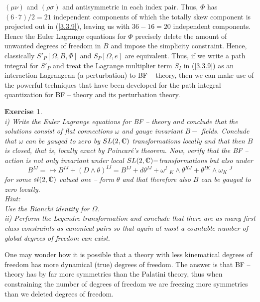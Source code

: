 \documentclass[12pt]{report}
\newtheorem{Exercise}{Exercise}[section]
\def\be{\begin{equation}}
\def\ee{\end{equation}}
\def\Cl{{\mathchoice
{\setbox0=\hbox{$\displaystyle\rm C$}\hbox{\hbox to0pt
{\kern0.4\wd0\vrule height0.9\ht0\hss}\box0}}
{\setbox0=\hbox{$\textstyle\rm C$}\hbox{\hbox to0pt
{\kern0.4\wd0\vrule height0.9\ht0\hss}\box0}}
{\setbox0=\hbox{$\scriptstyle\rm C$}\hbox{\hbox to0pt
{\kern0.4\wd0\vrule height0.9\ht0\hss}\box0}}
{\setbox0=\hbox{$\scriptscriptstyle\rm C$}\hbox{\hbox to0pt
{\kern0.4\wd0\vrule height0.9\ht0\hss}\box0}}}}
\begin{document}
$(\mu\nu)$ and $(\rho\sigma)$ and antisymmetric in each index pair.
Thus, $\Phi$ has $(6\cdot 7)/2=21$ independent components of which 
the totally skew component is projected out in (\ref{3.3.9}), leaving
us with $36-16=20$ independent components. Hence the Euler Lagrange
equations for $\Phi$ precisely delete the amount of unwanted degrees of 
freedom in $B$ and impose the simplicity constraint. Hence, 
classically $S'_P[\Omega,B,\Phi]$ and $S_P[\Omega,e]$ are equivalent. 
Thus, if we write a path integral for $S'_P$ and treat the Lagrange 
multiplier term $S_I$ in (\ref{3.3.9}) as an interaction Lagrangean  
(a perturbation) to BF -- theory, then
we can make use of the powerful techniques that have been developed for 
the path integral quantization for BF -- theory and its perturbation 
theory. 
%
\begin{Exercise} \label{ex3.3.2}  ~~~\\    
i) Write the Euler Lagrange equations for BF -- theory and conclude that
the solutions consist of flat connections $\omega$ and gauge invariant
$B-$ fields. Conclude that $\omega$ can be gauged to $zero$ by $SL(2,\Cl)$ 
transformations locally and that then $B$ is closed, that is, locally 
exact by Poincar\'e's theorem. Now, verify that the BF -- action is not 
only invariant under local $SL(2,\Cl)-$transformations but also under
\be \label{ex3.3.2a} 
B^{IJ}=\mapsto B^{IJ}+(D\wedge \theta)^{IJ}=
B^{IJ}+d\theta^{IJ}+\omega^I\;_K\wedge 
\theta^{KJ}+\theta^{IK}\wedge \omega_K\;^J
\ee
for some $sl(2,\Cl)$ valued one -- form $\theta$ and that therefore also
$B$ can be gauged to zero locally.\\
Hint:\\
Use the Bianchi identity for $\Omega$.\\
ii) Perform the Legendre transformation and conclude that there are as 
many first class constraints as canonical pairs so that again at most
a countable number of global degrees of freedom can exist.
\end{Exercise}
%   
One may wonder how it is possible that a theory with less 
kinematical degrees of freedom has more dynamical (true) degrees of 
freedom. The answer is that BF -- theory has by far more symmetries than 
the Palatini theory, thus when constraining the number of degrees of 
freedom we are freezing more symmetries than we deleted degrees of 
freedom.  
\end{document}

